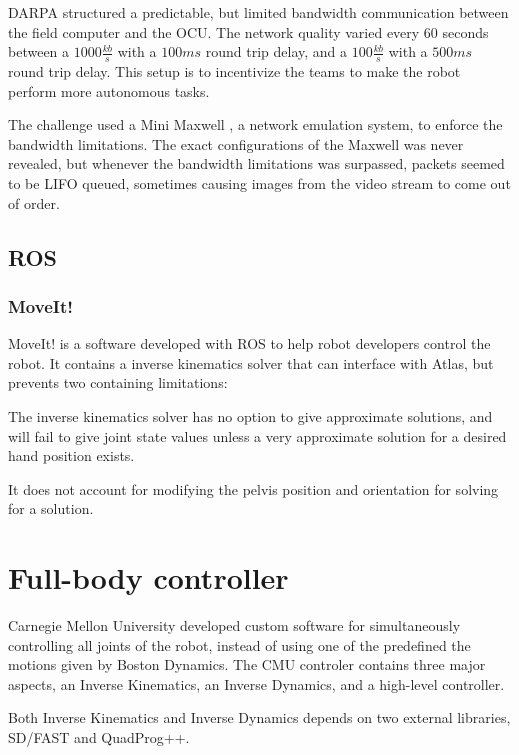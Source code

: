 \documentclass[12pt]{report}
\begin{document}
DARPA structured a predictable, but limited bandwidth communication between the field computer and the OCU. The network quality varied every 60 seconds between a $1000 \frac{kb}{s}$ with a $100ms$ round trip delay, and a $100 \frac{kb}{s}$ with a $500ms$ round trip delay. This setup is to incentivize the teams to make the robot perform more autonomous tasks.

The challenge used a Mini Maxwell \cite{minimaxwell}, a network emulation system, to enforce the bandwidth limitations. The exact configurations of the Maxwell was never revealed, but whenever the bandwidth limitations was surpassed, packets seemed to be LIFO queued, sometimes causing images from the video stream to come out of order. 

\subsection{ROS}

\subsubsection{MoveIt!}
MoveIt! is a software developed with ROS to help robot developers control the robot. It contains a inverse kinematics solver that can interface with Atlas, but prevents two containing limitations: 
\begin{inparaenum}
\item The inverse kinematics solver has no option to give approximate solutions, and will fail to give joint state values unless a very approximate solution for a desired hand position exists.
\item It does not account for modifying the pelvis position and orientation for solving for a solution. \end{inparaenum}

\section{Full-body controller}
Carnegie Mellon University developed custom software for simultaneously controlling all joints of the robot, instead of using one of the predefined the motions given by Boston Dynamics. The CMU controler contains three major aspects, an Inverse Kinematics, an Inverse Dynamics, and a high-level controller. 

Both Inverse Kinematics and Inverse Dynamics depends on two external libraries, SD/FAST and QuadProg++. 
\end{document}
